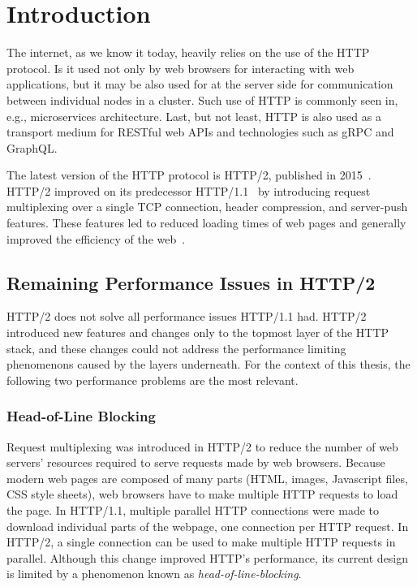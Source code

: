 \chapter{Introduction}

The internet, as we know it today, heavily relies on the use of the HTTP protocol. Is it used not
only by web browsers for interacting with web applications, but it may be also used for at the
server side for communication between individual nodes in a cluster. Such use of HTTP is commonly
seen in, e.g., microservices architecture. Last, but not least, HTTP is also used as a transport
medium for RESTful web APIs and technologies such as gRPC and GraphQL.

The latest version of the HTTP protocol is HTTP/2, published in 2015~\cite{rfc7540}. HTTP/2 improved
on its predecessor HTTP/1.1~\cite{rfc7230} by introducing request multiplexing over a single TCP
connection, header compression, and server-push features. These features led to reduced loading
times of web pages and generally improved the efficiency of the web~\cite{deSaxce2015}.

\section{Remaining Performance Issues in HTTP/2}

HTTP/2 does not solve all performance issues HTTP/1.1 had. HTTP/2 introduced new features and
changes only to the topmost layer of the HTTP stack, and these changes could not address the
performance limiting phenomenons caused by the layers underneath. For the context of this thesis,
the following two performance problems are the most relevant.

\subsection*{Head-of-Line Blocking}

Request multiplexing was introduced in HTTP/2 to reduce the number of web servers' resources
required to serve requests made by web browsers. Because modern web pages are composed of many parts
(HTML, images, Javascript files, CSS style sheets), web browsers have to make multiple HTTP requests
to load the page. In HTTP/1.1, multiple parallel HTTP connections were made to download individual
parts of the webpage, one connection per HTTP request. In HTTP/2, a single connection can be used to
make multiple HTTP requests in parallel. Although this change improved HTTP's performance, its
current design is limited by a phenomenon known as \textit{\gls{head-of-line-blocking}}.

